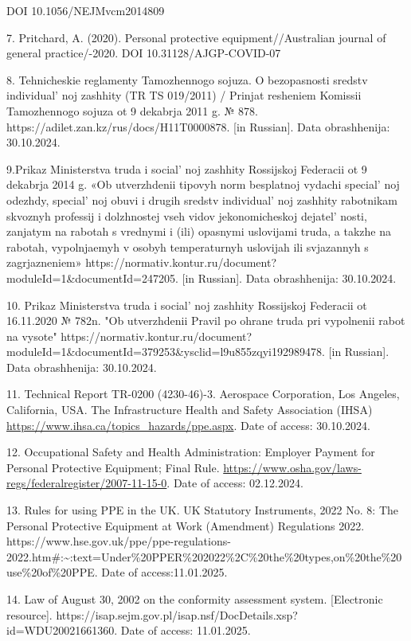 {DOI 10.1056/NEJMvcm2014809

7. Pritchard, A. (2020). Personal protective equipment//Australian
journal of general practice/-2020. DOI 10.31128/AJGP-COVID-07

8. Tehnicheskie reglamenty Tamozhennogo sojuza. O bezopasnosti sredstv
individual' noj zashhity (TR TS 019/2011) / Prinjat
resheniem Komissii Tamozhennogo sojuza ot 9 dekabrja 2011 g. № 878.
https://adilet.zan.kz/rus/docs/H11T0000878. {[}in Russian{]}. Data
obrashhenija: 30.10.2024.

9.Prikaz Ministerstva truda i social' noj zashhity
Rossijskoj Federacii ot 9 dekabrja 2014 g. «Ob utverzhdenii tipovyh norm
besplatnoj vydachi special' noj odezhdy,
special' noj obuvi i drugih sredstv
individual' noj zashhity rabotnikam skvoznyh professij i
dolzhnostej vseh vidov jekonomicheskoj dejatel' nosti,
zanjatym na rabotah s vrednymi i (ili) opasnymi uslovijami truda, a
takzhe na rabotah, vypolnjaemyh v osobyh temperaturnyh uslovijah ili
svjazannyh s zagrjazneniem»
https://normativ.kontur.ru/document?moduleId=1\&documentId=247205. {[}in
Russian{]}. Data obrashhenija: 30.10.2024.

10. Prikaz Ministerstva truda i social' noj zashhity
Rossijskoj Federacii ot 16.11.2020 № 782n. "Ob utverzhdenii Pravil po
ohrane truda pri vypolnenii rabot na vysote"
https://normativ.kontur.ru/document?moduleId=1\&documentId=379253\&ysclid=l9u855zqyi192989478.
{[}in Russian{]}. Data obrashhenija: 30.10.2024.

11. Technical Report TR-0200 (4230-46)-3. Aerospace Corporation, Los
Angeles, California, USA. The Infrastructure Health and Safety
Association (IHSA) \url{https://www.ihsa.ca/topics_hazards/ppe.aspx}.
Date of access: 30.10.2024.

12. Occupational Safety and Health Administration: Employer Payment for
Personal Protective Equipment; Final Rule.
\url{https://www.osha.gov/laws-regs/federalregister/2007-11-15-0}. Date
of access: 02.12.2024.

13. Rules for using PPE in the UK. UK Statutory Instruments, 2022 No. 8:
The Personal Protective Equipment at Work (Amendment) Regulations 2022.
https://www.hse.gov.uk/ppe/ppe-regulations-2022.htm\#:\textasciitilde:text=Under\%20PPER\%202022\%2C\%20the\%20types,on\%20the\%20use\%20of\%20PPE.
Date of access:11.01.2025.

14. Law of August 30, 2002 on the conformity assessment system.
{[}Electronic resource{]}.
https://isap.sejm.gov.pl/isap.nsf/DocDetails.xsp?id=WDU20021661360. Date
of access: 11.01.2025.

}
